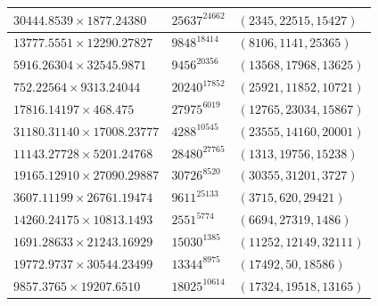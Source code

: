 \begin{longtable}{|l|l|l|}
  $30444.8539 \times 1877.24380$ & $25637^{24662}$ & $(2345,22515,15427)$ \\ \hline
  $13777.5551 \times 12290.27827$ & $9848^{18414}$ & $(8106,1141,25365)$ \\ \hline$5916.26304 \times 32545.9871$ & $9456^{20356}$ & $(13568,17968,13625)$ \\ \hline
  $752.22564 \times 9313.24044$ & $20240^{17852}$ & $(25921,11852,10721)$ \\ \hline
  $17816.14197 \times 468.475$ & $27975^{6019}$ & $(12765,23034,15867)$ \\ \hline
  $31180.31140 \times 17008.23777$ & $4288^{10545}$ & $(23555,14160,20001)$ \\ \hline
  $11143.27728 \times 5201.24768$ & $28480^{27765}$ & $(1313,19756,15238)$ \\ \hline
  $19165.12910 \times 27090.29887$ & $30726^{8520}$ & $(30355,31201,3727)$ \\ \hline
  $3607.11199 \times 26761.19474$ & $9611^{25133}$ & $(3715,620,29421)$ \\ \hline
  $14260.24175 \times 10813.1493$ & $2551^{5774}$ & $(6694,27319,1486)$ \\ \hline
  $1691.28633 \times 21243.16929$ & $15030^{1385}$ & $(11252,12149,32111)$ \\ \hline
  $19772.9737 \times 30544.23499$ & $13344^{8975}$ & $(17492,50,18586)$ \\ \hline
  $9857.3765 \times 19207.6510$ & $18025^{10614}$ & $(17324,19518,13165)$

\end{longtable}





